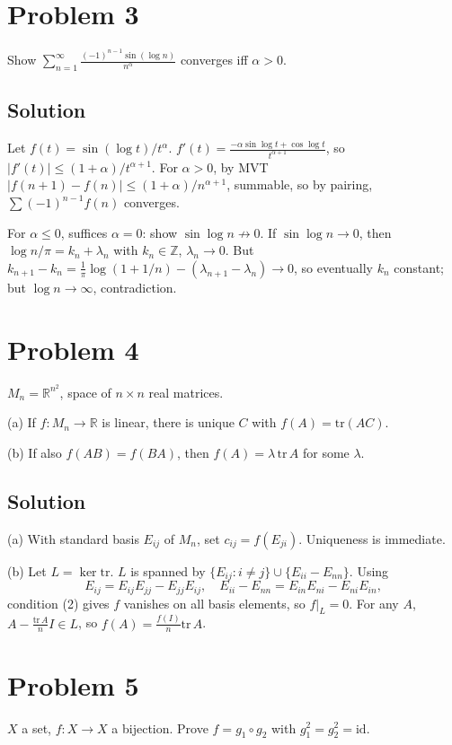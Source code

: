 \documentclass{article}
\begin{document}
\section*{Problem 3}
Show $\sum_{n=1}^\infty \frac{(-1)^{n-1}\sin(\log n)}{n^\alpha}$ converges iff $\alpha>0$.

\subsection*{Solution}
Let $f(t) = \sin(\log t)/t^\alpha$. $f'(t) = \frac{-\alpha\sin\log t + \cos\log t}{t^{\alpha+1}}$, so $|f'(t)|\le (1+\alpha)/t^{\alpha+1}$. For $\alpha>0$, by MVT $|f(n+1)-f(n)|\le (1+\alpha)/n^{\alpha+1}$, summable, so by pairing, $\sum(-1)^{n-1}f(n)$ converges.

For $\alpha\le 0$, suffices $\alpha=0$: show $\sin\log n\not\to 0$. If $\sin\log n\to 0$, then $\log n/\pi = k_n+\lambda_n$ with $k_n\in\mathbb{Z}$, $\lambda_n\to 0$. But $k_{n+1}-k_n = \frac{1}{\pi}\log(1+1/n) - (\lambda_{n+1}-\lambda_n)\to 0$, so eventually $k_n$ constant; but $\log n\to\infty$, contradiction.

\section*{Problem 4}
$M_n = \mathbb{R}^{n^2}$, space of $n\times n$ real matrices.

(a) If $f:M_n\to\mathbb{R}$ is linear, there is unique $C$ with $f(A)=\mathrm{tr}(AC)$.

(b) If also $f(AB)=f(BA)$, then $f(A)=\lambda\,\mathrm{tr}\,A$ for some $\lambda$.

\subsection*{Solution}
(a) With standard basis $E_{ij}$ of $M_n$, set $c_{ij} = f(E_{ji})$. Uniqueness is immediate.

(b) Let $L = \ker\mathrm{tr}$. $L$ is spanned by $\{E_{ij} : i\ne j\}\cup\{E_{ii}-E_{nn}\}$. Using
\[E_{ij} = E_{ij}E_{jj} - E_{jj}E_{ij},\quad E_{ii}-E_{nn} = E_{in}E_{ni}-E_{ni}E_{in},\]
condition (2) gives $f$ vanishes on all basis elements, so $f|_L=0$. For any $A$, $A - \frac{\mathrm{tr}\,A}{n} I\in L$, so $f(A) = \frac{f(I)}{n}\mathrm{tr}\,A$.

\section*{Problem 5}
$X$ a set, $f:X\to X$ a bijection. Prove $f = g_1\circ g_2$ with $g_1^2=g_2^2 = \mathrm{id}$.
\end{document}
